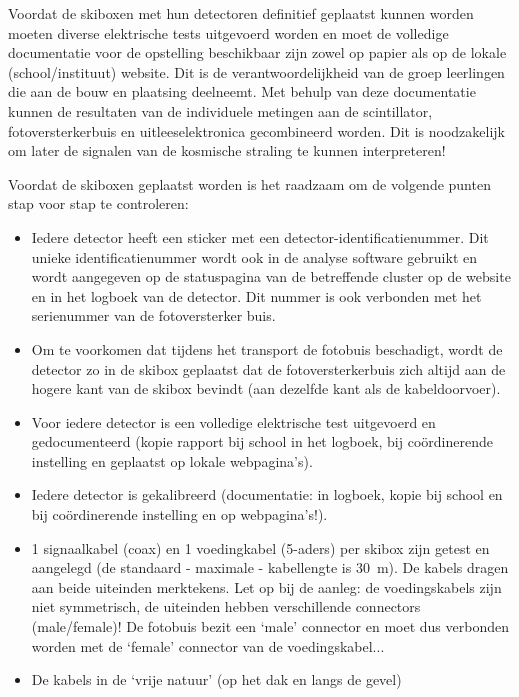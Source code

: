 Voordat de skiboxen met hun detectoren definitief geplaatst kunnen
worden moeten diverse elektrische tests uitgevoerd worden en moet de
volledige documentatie voor de opstelling beschikbaar zijn zowel op
papier als op de lokale (school/instituut) website. Dit is de
verantwoordelijkheid van de groep leerlingen die aan de bouw en
plaatsing deelneemt. Met behulp van deze documentatie kunnen de
resultaten van de individuele metingen aan de scintillator,
fotoversterkerbuis en uitleeselektronica gecombineerd worden. Dit is
noodzakelijk om later de signalen van de kosmische straling te kunnen
interpreteren!

Voordat de skiboxen geplaatst worden is het raadzaam om de volgende
punten stap voor stap te controleren:

\begin{itemize}
    \item Iedere detector heeft een sticker met een
    detector-identificatienummer. Dit unieke identificatienummer wordt
    ook in de analyse software gebruikt en wordt aangegeven op de
    statuspagina van de betreffende cluster op de \hisparc website en in
    het logboek van de detector. Dit nummer is ook verbonden met het
    serienummer van de fotoversterker buis.
    \item Om te voorkomen dat tijdens het transport de fotobuis
    beschadigt, wordt de detector zo in de skibox geplaatst dat de
    fotoversterkerbuis zich altijd aan de hogere kant van de skibox
    bevindt (aan dezelfde kant als de kabeldoorvoer).
    \item Voor iedere detector is een volledige elektrische test
    uitgevoerd en gedocumenteerd (kopie rapport bij school in het
    logboek, bij coördinerende instelling en geplaatst op lokale
    webpagina’s).
    \item Iedere detector is gekalibreerd (documentatie: in logboek,
    kopie bij school en bij coördinerende instelling en op
    webpagina’s!).
    \item 1 signaalkabel (coax) en 1 voedingkabel (5-aders) per skibox
    zijn getest en aangelegd (de standaard - maximale - kabellengte is
    \SI{30}{\meter}). De kabels dragen aan beide uiteinden merktekens.
    Let op bij de aanleg: de voedingskabels zijn niet symmetrisch, de
    uiteinden hebben verschillende connectors (male/female)! De fotobuis
    bezit een ‘male’ connector en moet dus verbonden worden met de
    ‘female’ connector van de voedingskabel...
    \item De kabels in de ‘vrije natuur’ (op het dak en langs de gevel)

\end{itemize}
